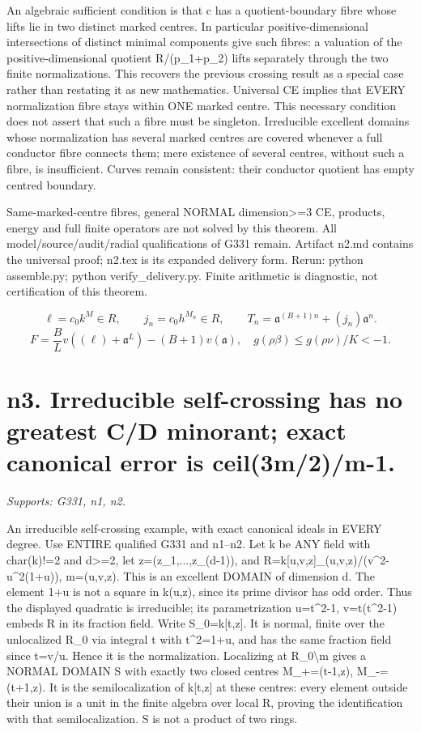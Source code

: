 \documentclass[11pt]{article}
\begin{document}
An algebraic sufficient condition is that c has a quotient-boundary fibre whose lifts lie in two distinct marked centres. In particular positive-dimensional intersections of distinct minimal components give such fibres: a valuation of the positive-dimensional quotient R/(p\_1+p\_2) lifts separately through the two finite normalizations. This recovers the previous crossing result as a special case rather than restating it as new mathematics. Universal CE implies that EVERY normalization fibre stays within ONE marked centre. This necessary condition does not assert that such a fibre must be singleton. Irreducible excellent domains whose normalization has several marked centres are covered whenever a full conductor fibre connects them; mere existence of several centres, without such a fibre, is insufficient. Curves remain consistent: their conductor quotient has empty centred boundary.

Same-marked-centre fibres, general NORMAL dimension\textgreater{}=3 CE, products, energy and full finite operators are not solved by this theorem. All model/source/audit/radial qualifications of G331 remain. Artifact n2.md contains the universal proof; n2.tex is its expanded delivery form. Rerun: python assemble.py; python verify\_delivery.py. Finite arithmetic is diagnostic, not certification of this theorem.

\[
 \ell=c_0k^M\in R,\qquad j_n=c_0h^{M_n}\in R,\qquad
 T_n=\mathfrak a^{(B+1)n}+(j_n)\mathfrak a^n.
\]
\[
 F=\frac BL v((\ell)+\mathfrak a^L)-(B+1)v(\mathfrak a),\quad
 g(\rho\beta)\le g(\rho\nu)/K<-1.
\]


\section{n3. Irreducible self-crossing has no greatest C/D minorant; exact canonical error is ceil(3m/2)/m-1.}
\textit{Supports: G331, n1, n2.}

An irreducible self-crossing example, with exact canonical ideals in EVERY degree. Use ENTIRE qualified G331 and n1--n2. Let k be ANY field with char(k)!=2 and d\textgreater{}=2, let z=(z\_1,...,z\_(d-1)), and
R=k[u,v,z]\_(u,v,z)/(v\textasciicircum{}2-u\textasciicircum{}2(1+u)), m=(u,v,z).
This is an excellent DOMAIN of dimension d. The element 1+u is not a square in k(u,z), since its prime divisor has odd order. Thus the displayed quadratic is irreducible; its parametrization u=t\textasciicircum{}2-1, v=t(t\textasciicircum{}2-1) embeds R in its fraction field. Write S\_0=k[t,z]. It is normal, finite over the unlocalized R\_0 via integral t with t\textasciicircum{}2=1+u, and has the same fraction field since t=v/u. Hence it is the normalization. Localizing at R\_0\textbackslash{}m gives a NORMAL DOMAIN S with exactly two closed centres M\_+=(t-1,z), M\_-=(t+1,z). It is the semilocalization of k[t,z] at these centres: every element outside their union is a unit in the finite algebra over local R, proving the identification with that semilocalization. S is not a product of two rings.
\end{document}
